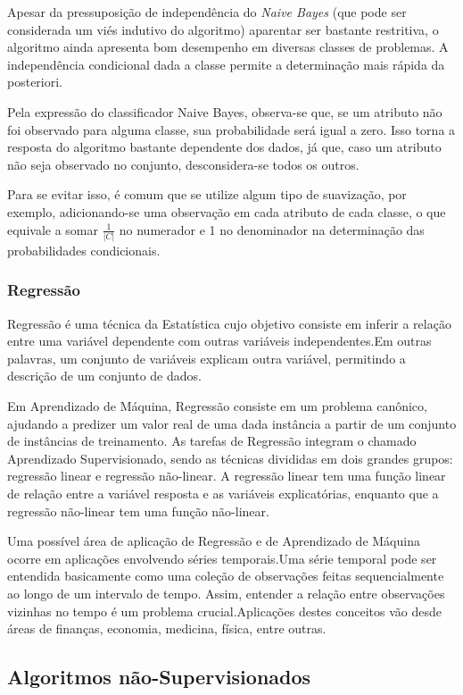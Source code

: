 \documentclass{article}
\begin{document}
Apesar da pressuposição de independência do {\it Naive Bayes}
(que pode ser considerada um viés indutivo do algoritmo) aparentar ser bastante restritiva,
o algoritmo ainda apresenta bom desempenho em diversas classes de problemas.
A independência condicional dada a classe permite a determinação mais rápida da posteriori.

Pela expressão do classificador Naive Bayes, observa-se que,
se um atributo não foi observado para alguma classe, sua probabilidade será igual a zero.
Isso torna a resposta do algoritmo bastante dependente dos dados,
já que, caso um atributo não seja observado no conjunto, desconsidera-se todos os outros.

Para se evitar isso, é comum que se utilize algum tipo de suavização, por exemplo,
adicionando-se uma observação em cada atributo de cada classe,
o que equivale a somar $\frac{1}{|C|}$ no numerador e 1 no denominador na determinação das probabilidades condicionais.

\subsubsection{Regressão}

Regressão é uma técnica da Estatística cujo objetivo consiste em inferir a relação entre uma variável dependente com outras variáveis independentes.Em outras palavras, um conjunto de variáveis explicam outra variável, permitindo a descrição de um conjunto de dados.

Em Aprendizado de Máquina, Regressão consiste em um problema canônico, ajudando a predizer um valor real de uma dada instância a partir de um conjunto de instâncias de treinamento. As tarefas de Regressão integram o chamado Aprendizado Supervisionado, sendo as técnicas divididas em dois grandes grupos: regressão linear e regressão não-linear. A regressão linear tem uma função linear de relação entre a variável resposta e as variáveis explicatórias, enquanto que a regressão não-linear tem uma função não-linear.

Uma possível área de aplicação de Regressão e de Aprendizado de Máquina ocorre em aplicações envolvendo séries temporais.Uma série temporal pode ser entendida basicamente como uma coleção de observações feitas sequencialmente ao longo de um intervalo de tempo. Assim, entender a relação entre observações vizinhas no tempo é um problema crucial.Aplicações destes conceitos vão desde áreas de finanças, economia, medicina, física, entre outras.

\subsection{Algoritmos não-Supervisionados}
\end{document}
